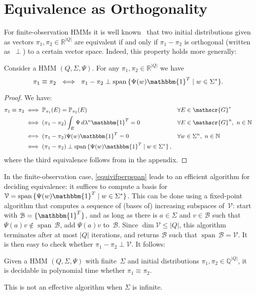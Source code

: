 \documentclass[a4paper,UKenglish,cleveref, autoref,mathscr]{lipics-v2019}
\newcommand{\RR}{\mathbb{R}}
\newcommand{\NN}{\mathbb{N}}
\newcommand{\QQ}{\mathbb{Q}}
\newcommand{\PP}{\mathbb{P}}
\newcommand{\GG}{\mathscr{G}}
\newcommand{\1}{\mathbbm{1}}
\DeclareMathOperator{\Span}{span\,}
\begin{document}
\section{Equivalence as Orthogonality}

For finite-observation HMMs it is well known~\cite{schut61,Paz71,Tzeng92,CortesMRdistance} that two initial distributions given as vectors $\pi_1, \pi_2 \in \RR^{|Q|}$ are equivalent if and only if $\pi_1 - \pi_2$ is orthogonal (written as~$\perp$) to a certain vector space.
Indeed, this property holds more generally:

\begin{proposition}\label{equivifperpspan}
Consider a HMM $(Q, \Sigma, \Psi)$.
For any $\pi_1, \pi_2 \in \RR^{|Q|}$ we have
\[\pi_1 \equiv \pi_2 \ \iff \ \pi_1 - \pi_2 \perp \Span \{\Psi(w)\1^T \mid w \in \Sigma^*\}.\]
\end{proposition}
\begin{proof}
We have:
\begin{align*}
\pi_1 \equiv \pi_2 & \iff \PP_{\pi_1}(E) = \PP_{\pi_2}(E) & & \forall E \in \GG^* \\
& \iff (\pi_1 - \pi_2) \int_{E} \Psi\, d\lambda^n \1^T = 0 & & \forall E \in \GG^n,\ n \in \NN \\
& \iff (\pi_1 - \pi_2) \Psi(w) \1^T = 0 & & \forall w \in \Sigma^n,\ n \in \NN\\
& \iff (\pi_1 - \pi_2) \perp \Span \{\Psi(w) \1^T \mid w \in \Sigma^*\}\,,
\end{align*}
where the third equivalence follows from  in the appendix.
\end{proof}

In the finite-observation case, \cref{equivifperpspan} leads to an efficient algorithm for deciding equivalence: it suffices to compute a basis for $\mathcal{V} = \Span \{\Psi(w)\1^T \mid w \in \Sigma^*\}$.
This can be done using a fixed-point algorithm that computes a sequence of (bases of) increasing subspaces of~$\mathcal{V}$: start with $\mathcal{B} = \{\1^T\}$, and as long as there is $a \in \Sigma$ and $v \in \mathcal{B}$ such that $\Psi(a) v \not\in \Span \mathcal{B}$, add $\Psi(a) v$ to~$\mathcal{B}$.
Since $\dim \mathcal{V} \le |Q|$, this algorithm terminates after at most $|Q|$ iterations, and returns $\mathcal{B}$ such that $\Span \mathcal{B} = \mathcal{V}$.
It is then easy to check whether $\pi_1 - \pi_2 \perp \mathcal{V}$.
It follows:
\begin{proposition} \label{prop-finite-HMM}
Given a HMM $(Q, \Sigma, \Psi)$ with finite~$\Sigma$ and initial distributions $\pi_1, \pi_2 \in \QQ^{|Q|}$, it is decidable in polynomial time whether $\pi_1 \equiv \pi_2$.
\end{proposition}
This is not an effective algorithm when $\Sigma$ is infinite.
\end{document}

